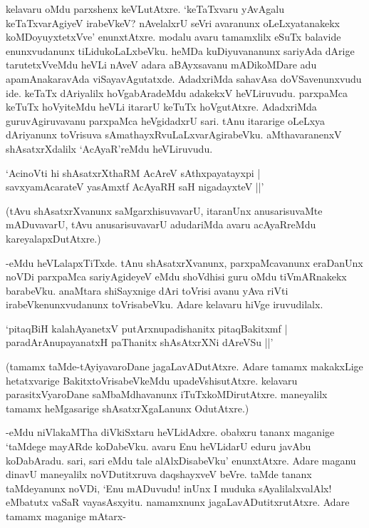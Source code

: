 kelavaru oMdu parxshenx keVLutAtxre. `keTaTxvaru yAvAgalu keTaTxvarAgiyeV irabeVkeV? nAvelalxrU seVri avaranunx oLeLxyatanakekx koMDoyuyxtetxVve' enunxtAtxre. modalu avaru tamamxlilx eSuTx balavide enunxvudanunx tiLidukoLaLxbeVku. heMDa kuDiyuvananunx sariyAda dArige tarutetxVveMdu heVLi nAveV adara aBAyxsavanu mADikoMDare adu apamAnakaravAda viSayavAgutatxde. AdadxriMda sahavAsa doVSavenunxvudu ide. keTaTx dAriyalilx hoVgabAradeMdu adakekxV heVLiruvudu. parxpaMca keTuTx hoVyiteMdu heVLi itararU keTuTx hoVgutAtxre. AdadxriMda guruvAgiruvavanu parxpaMca heVgidadxrU sari. tAnu itararige oLeLxya dAriyanunx toVrisuva sAmathayxRvuLaLxvarAgirabeVku. aMthavaranenxV shAsatxrXdalilx `AcAyaR'reMdu heVLiruvudu. 

\begin{shloka} 
`AcinoVti hi shAsatxrXthaRM AcAreV sAthxpayatayxpi |\\
savxyamAcarateV yasAmxtf AcAyaRH saH nigadayxteV ||'
\end{shloka}
 
(tAvu shAsatxrXvanunx saMgarxhisuvavarU, itaranUnx anusarisuvaMte mADuvavarU, tAvu anusarisuvavarU adudariMda avaru acAyaRreMdu kareyalapxDutAtxre.)

-eMdu heVLalapxTiTxde. tAnu shAsatxrXvanunx, parxpaMcavanunx eraDanUnx noVDi parxpaMca sariyAgideyeV eMdu shoVdhisi guru oMdu tiVmARnakekx barabeVku. anaMtara shiSayxnige dAri toVrisi avanu yAva riVti irabeVkenunxvudanunx toVrisabeVku. Adare kelavaru hiVge iruvudilalx. 


\begin{shloka}
`pitaqBiH kalahAyanetxV putArxnupadishanitx pitaqBakitxmf |\\
paradArAnupayanatxH paThanitx shAsAtxrXNi dAreVSu ||'
\end{shloka}

(tamamx taMde-tAyiyavaroDane jagaLavADutAtxre. Adare tamamx makakxLige hetatxvarige BakitxtoVrisabeVkeMdu upadeVshisutAtxre. kelavaru parasitxVyaroDane saMbaMdhavanunx iTuTxkoMDirutAtxre. maneyalilx tamamx heMgasarige shAsatxrXgaLanunx OdutAtxre.)

-eMdu niVlakaMTha diVkiSxtaru heVLidAdxre. obabxru tananx maganige `taMdege mayARde koDabeVku. avaru Enu heVLidarU eduru javAbu koDabAradu. sari, sari eMdu tale alAlxDisabeVku' enunxtAtxre. Adare maganu dinavU maneyalilx noVDutitxruva daqshayxveV beVre. taMde tananx taMdeyanunx noVDi, `Enu mADuvudu! inUnx I muduka sAyalilalxvalAlx! eMbatutx vaSaR vayasAsxyitu. namamxnunx jagaLavADutitxrutAtxre. Adare tamamx maganige mAtarx-

